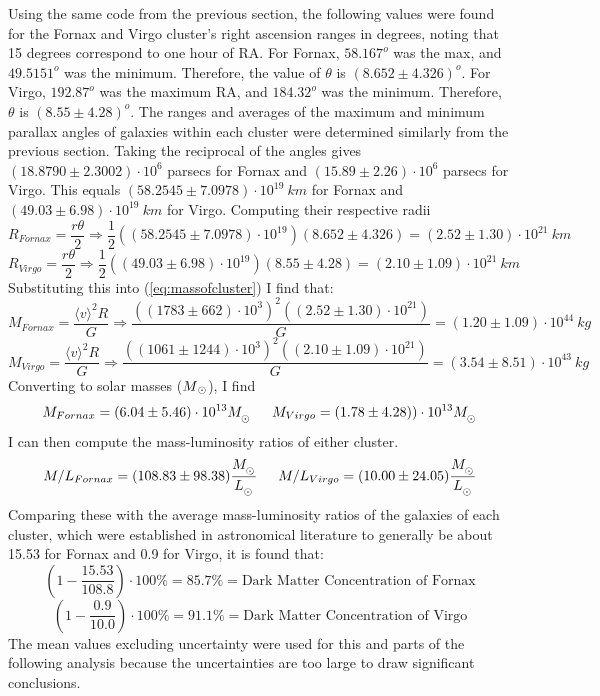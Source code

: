 \documentclass[12pt]{article}
\begin{document}
Using the same code from the previous section, the following values were found for the Fornax and Virgo cluster's right ascension ranges in degrees, noting that 15 degrees correspond to one hour of RA. For Fornax, $58.167^o$ was the max, and $49.5151^o$ was the minimum. Therefore, the value of $\theta$ is $(8.652 \pm 4.326)^o$. For Virgo, $192.87^o$ was the maximum RA, and $184.32^o$ was the minimum. Therefore, $\theta$ is $( 8.55\pm 4.28)^o$. The ranges and averages of the maximum and minimum parallax angles of galaxies within each cluster were determined similarly from the previous section. Taking the reciprocal of the angles gives $(18.8790 \pm 2.3002) \cdot 10^{6}$ parsecs for Fornax and $(15.89 \pm 2.26)\cdot 10^6$ parsecs for Virgo. This equals $(58.2545 \pm 7.0978 )\cdot 10^{19} \:km$ for Fornax and $ (49.03 \pm 6.98)\cdot 10^{19}\:km$ for Virgo. Computing their respective radii
$$ R_{Fornax} = \frac{r \theta}{2} \Rightarrow \frac{1}{2}((58.2545 \pm 7.0978 )\cdot 10^{19})(8.652 \pm 4.326) = (2.52 \pm 1.30) \cdot 10^{21}\:km$$
$$ R_{Virgo} = \frac{r \theta}{2} \Rightarrow \frac{1}{2}((49.03 \pm 6.98)\cdot 10^{19})( 8.55 ± 4.28) = (2.10 \pm 1.09 )\cdot 10^{21}\:km$$
Substituting this into (\ref{eq:massofcluster}) I find that:
$$ M_{Fornax} = \frac{\langle v \rangle ^2 R}{G} \Rightarrow \frac{((1783 \pm 662) \cdot 10^3)^2 ((2.52 \pm 1.30) \cdot 10^{21})}{G} = (1.20 \pm 1.09) \cdot 10^{44} \: kg$$
$$ M_{Virgo} =  \frac{\langle v \rangle ^2 R}{G} \Rightarrow \frac{((1061 \pm 1244)\cdot 10^3)^2 ((2.10 \pm 1.09) \cdot 10^{21})}{G} = (3.54 \pm 8.51 ) \cdot 10^{43} \: kg$$
Converting to solar masses ($M\textsubscript{\(\odot\)}$), I find
$$M_{Fornax} = (6.04 \pm 5.46) \cdot 10^{13} M_\textsubscript{\(\odot\)} \hspace{15pt} M_{Virgo} = (1.78 \pm 4.28))\cdot 10^{13} M_\textsubscript{\(\odot\)} $$
I can then compute the mass-luminosity ratios of either cluster.
$$M/L _{Fornax} = (108.83 \pm 98.38) \frac{M_\textsubscript{\(\odot\)}}{L_\textsubscript{\(\odot\)}} \hspace{15pt} M/L_{Virgo} = (10.00 \pm 24.05) \frac{M_\textsubscript{\(\odot\)}}{L_\textsubscript{\(\odot\)}}$$
Comparing these with the average mass-luminosity ratios of the galaxies of each cluster, which were established in astronomical literature to generally be about 15.53 for Fornax and 0.9 for Virgo, it is found that\cite{lindblad}:
$$(1-\frac{15.53}{108.8}) \cdot 100\% = 85.7\% = \text{Dark Matter Concentration of Fornax}$$
$$ (1-\frac{0.9}{10.0}) \cdot 100\% = 91.1\% = \text{Dark Matter Concentration of Virgo} $$
The mean values excluding uncertainty were used for this and parts of the following analysis because the uncertainties are too large to draw significant conclusions.
\FloatBarrier
\end{document}
